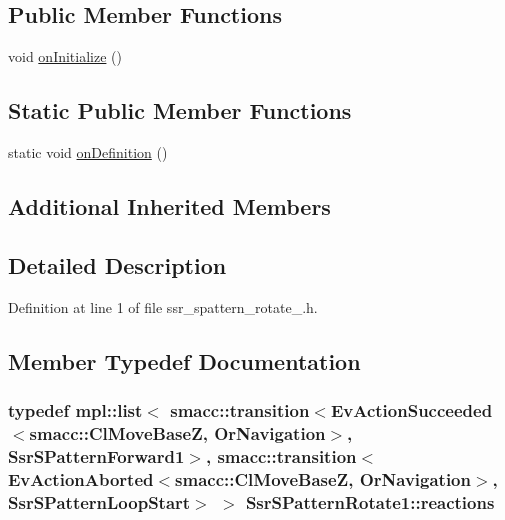 \subsection*{Public Member Functions}
\begin{DoxyCompactItemize}
\item 
void \hyperlink{structSsrSPatternRotate1_a8e3038ccd3fd6007ea7614ba703b7948}{on\+Initialize} ()
\end{DoxyCompactItemize}
\subsection*{Static Public Member Functions}
\begin{DoxyCompactItemize}
\item 
static void \hyperlink{structSsrSPatternRotate1_aa1ceb73aab8fe995f57e02b9edec44a8}{on\+Definition} ()
\end{DoxyCompactItemize}
\subsection*{Additional Inherited Members}


\subsection{Detailed Description}


Definition at line 1 of file ssr\+\_\+spattern\+\_\+rotate\+\_.\+h.



\subsection{Member Typedef Documentation}
\subsubsection[{\texorpdfstring{reactions}{reactions}}]{\setlength{\rightskip}{0pt plus 5cm}typedef mpl\+::list$<$ {\bf smacc\+::transition}$<$Ev\+Action\+Succeeded$<${\bf smacc\+::\+Cl\+Move\+BaseZ}, {\bf Or\+Navigation}$>$, {\bf Ssr\+S\+Pattern\+Forward1}$>$, {\bf smacc\+::transition}$<$Ev\+Action\+Aborted$<${\bf smacc\+::\+Cl\+Move\+BaseZ}, {\bf Or\+Navigation}$>$, {\bf Ssr\+S\+Pattern\+Loop\+Start}$>$ $>$ {\bf Ssr\+S\+Pattern\+Rotate1\+::reactions}}\hypertarget{structSsrSPatternRotate1_a47facb02d41f2e17a062221c111a4457}{}\label{structSsrSPatternRotate1_a47facb02d41f2e17a062221c111a4457}


